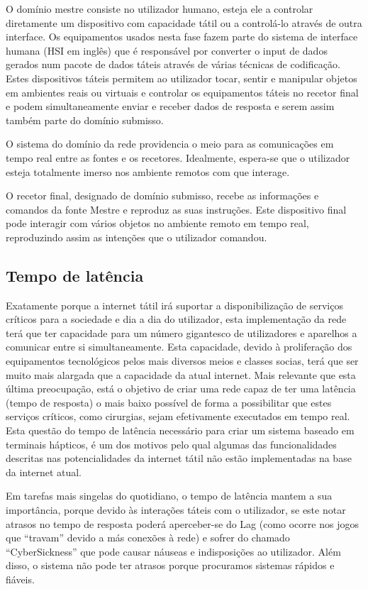 \documentclass{llncs}
\begin{document}
O domínio mestre consiste no utilizador humano, esteja ele a controlar diretamente um dispositivo com capacidade tátil ou a controlá-lo através de outra interface. Os equipamentos usados nesta fase fazem parte do sistema de interface humana (HSI em inglês) que é responsável por converter o input de dados gerados num pacote de dados táteis através de várias técnicas de codificação. Estes dispositivos táteis permitem ao utilizador tocar, sentir e manipular objetos em ambientes reais ou virtuais e controlar os equipamentos táteis no recetor final e podem simultaneamente enviar e receber dados de resposta e serem assim também parte do domínio submisso.

O sistema do domínio da rede providencia o meio para as comunicações em tempo real entre as fontes e os recetores. Idealmente, espera-se que o utilizador esteja totalmente imerso nos ambiente remotos com que interage. 

O recetor final, designado de domínio submisso, recebe as informações e comandos da fonte Mestre e reproduz as suas instruções. Este dispositivo final pode interagir com vários objetos no ambiente remoto em tempo real, reproduzindo assim as intenções que o utilizador comandou.


\subsection{Tempo de latência}
\setlength{\parindent}{0.5cm}
Exatamente porque a internet tátil irá suportar a disponibilização de serviços críticos para a sociedade e dia a dia do utilizador, esta implementação da rede terá que ter capacidade para um número gigantesco de utilizadores e aparelhos a comunicar entre si simultaneamente. Esta capacidade, devido à proliferação dos equipamentos tecnológicos pelos mais diversos meios e classes socias, terá que ser muito mais alargada que a capacidade da atual internet. Mais relevante que esta última preocupação, está o objetivo de criar uma rede capaz de ter uma latência (tempo de resposta) o mais baixo possível de forma a possibilitar que estes serviços críticos, como cirurgias, sejam efetivamente executados em tempo real. Esta questão do tempo de latência necessário para criar um sistema baseado em terminais hápticos, é um dos motivos pelo qual algumas das funcionalidades descritas nas potencialidades da internet tátil não estão implementadas na base da internet atual.

Em tarefas mais singelas do quotidiano, o tempo de latência mantem a sua importância, porque devido às interações táteis com o utilizador, se este notar atrasos no tempo de resposta poderá aperceber-se do Lag (como ocorre nos jogos que “travam” devido a más conexões à rede) e sofrer do chamado “CyberSickness” que pode causar náuseas e indisposições ao utilizador.  Além disso, o sistema não pode ter atrasos porque procuramos sistemas rápidos e fiáveis.
\end{document}
